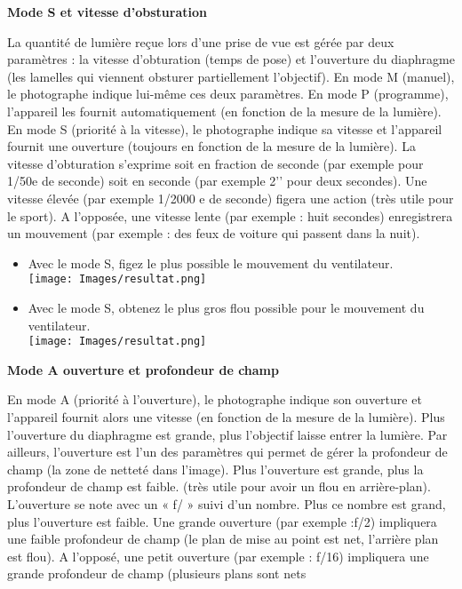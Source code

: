 \documentclass[10pt,fleqn]{article} %
\begin{document}
\begin{defi}
\textbf{Mode S et vitesse d’obsturation}


La quantité de lumière reçue lors d’une prise de vue est gérée par deux paramètres : la vitesse d’obturation (temps de pose) et l’ouverture du diaphragme (les lamelles qui viennent obsturer partiellement l’objectif). En mode M (manuel), le photographe indique lui-même ces deux paramètres. En mode P (programme), l’appareil les fournit automatiquement (en fonction de la mesure de la lumière). En mode S (priorité à la vitesse), le photographe indique sa vitesse et l’appareil fournit une ouverture (toujours en fonction de la mesure de la lumière).
La vitesse d’obturation s’exprime soit en fraction de seconde (par exemple  pour 1/50e de seconde) soit en seconde (par exemple 2’’ pour deux secondes). Une vitesse élevée (par exemple 1/2000 e de seconde) figera une action (très utile pour le sport). A l’opposée, une vitesse lente (par exemple : huit secondes) enregistrera un mouvement (par exemple : des feux de voiture qui passent dans la nuit).


\end{defi}


\begin{itemize}
\item Avec le mode S, figez le plus possible le mouvement du ventilateur.
\\ \texttt{[image: Images/resultat.png]}
\item Avec le mode S, obtenez le plus gros flou possible pour le mouvement du ventilateur.
\\ \texttt{[image: Images/resultat.png]}
\end{itemize}



\begin{defi}
\textbf{Mode A ouverture et profondeur de champ}

En mode A (priorité à l’ouverture), le photographe indique son ouverture et l’appareil fournit alors une vitesse (en fonction de la mesure de la lumière). Plus l’ouverture du diaphragme est grande, plus l’objectif laisse entrer la lumière. Par ailleurs, l’ouverture est l’un des paramètres qui permet de gérer la profondeur de champ (la zone de netteté dans l’image). Plus l’ouverture est grande, plus la profondeur de champ est faible. (très utile pour avoir un flou en arrière-plan).
L’ouverture se note avec un « f/ » suivi d’un nombre. Plus ce nombre est grand, plus l’ouverture est faible. Une grande ouverture (par exemple :f/2) impliquera une faible profondeur de champ (le plan de mise au point est net, l’arrière plan est flou). A l’opposé, une petit ouverture (par exemple : f/16) impliquera une grande profondeur de champ (plusieurs plans sont nets

\end{defi}
\end{document}
